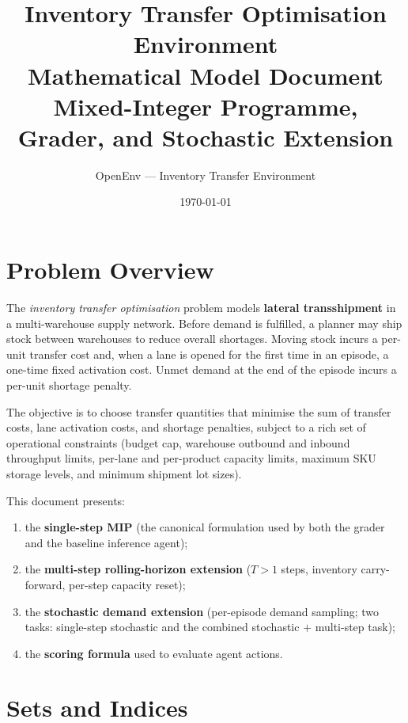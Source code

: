 \documentclass[11pt, a4paper]{article}
\title{%
  \textbf{Inventory Transfer Optimisation Environment}\\[6pt]
  \large Mathematical Model Document\\[4pt]
  \normalsize Mixed-Integer Programme, Grader, and Stochastic Extension
}
\author{OpenEnv --- Inventory Transfer Environment}
\date{\today}
\begin{document}
\maketitle
\tableofcontents
\newpage

\section{Problem Overview}

The \emph{inventory transfer optimisation} problem models \textbf{lateral
transshipment} in a multi-warehouse supply network.  Before demand is
fulfilled, a planner may ship stock between warehouses to reduce overall
shortages.  Moving stock incurs a per-unit transfer cost and, when a lane
is opened for the first time in an episode, a one-time fixed activation
cost.  Unmet demand at the end of the episode incurs a per-unit shortage
penalty.

The objective is to choose transfer quantities that minimise the sum of
transfer costs, lane activation costs, and shortage penalties, subject to
a rich set of operational constraints (budget cap, warehouse outbound and
inbound throughput limits, per-lane and per-product capacity limits,
maximum SKU storage levels, and minimum shipment lot sizes).

This document presents:
\begin{enumerate}[noitemsep]
  \item the \textbf{single-step MIP} (the canonical formulation used by
        both the grader and the baseline inference agent);
  \item the \textbf{multi-step rolling-horizon extension} ($T > 1$
        steps, inventory carry-forward, per-step capacity reset);
  \item the \textbf{stochastic demand extension} (per-episode demand
        sampling; two tasks: single-step stochastic and the combined
        stochastic $+$ multi-step task);
  \item the \textbf{scoring formula} used to evaluate agent actions.
\end{enumerate}

\section{Sets and Indices}
\end{document}
